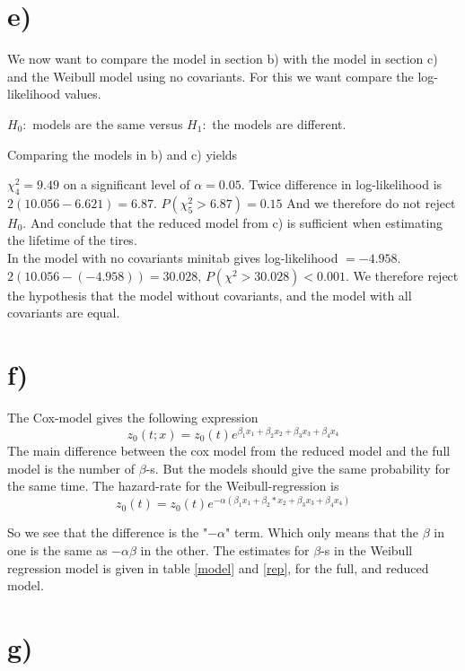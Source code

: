 \documentclass[10pt, a4paper]{article}
\begin{document}
\section*{e)}
We now want to compare the model in section b) with the model in section c) and the Weibull model using no covariants. For this we want compare the log-likelihood values.

$H_0:$ models are the same versus $H_1: $ the models are different.

Comparing the models in b) and c) yields

$\chi^2_4=9.49$ on a significant level of $\alpha = 0.05$. Twice difference in log-likelihood is $2(10.056-6.621) =6.87 $.
$P(\chi^2_5 > 6.87) = 0.15 $ And we therefore do not reject $H_0$. And conclude that the reduced model from c) is sufficient when estimating the lifetime of the tires.  \\


In the model with no covariants minitab gives log-likelihood $= -4.958$. $2(10.056-(-4.958)) =30.028 $, $P(\chi^2 > 30.028) < 0.001$. We therefore reject the hypothesis that the model without covariants, and the model with all covariants are equal. 

\section*{f)} %

The Cox-model gives the following expression $$ z_0(t;x) =z_0(t) e^{\beta_1x_1+\beta_2x_2+\beta_3x_3+\beta_4x_4} $$ The main difference between the cox model from the reduced model and the full model is the number of $\beta$-s. But the models should give the same probability for the same time. 
The hazard-rate for the Weibull-regression is $$ z_0(t) = z_0(t) e^{-\alpha(\beta_1x_1+\beta_2*x_2+\beta_3 x_3+\beta_4 x_4)} $$

So we see that the difference is the "$-\alpha$" term. Which only means that the $\beta$ in one is the same as $-\alpha \beta$ in the other.  The estimates for $ \beta $-s in the Weibull regression model is given in table \ref{model} and \ref{rep}, for the full, and reduced model.

\section*{g)}
\end{document}
